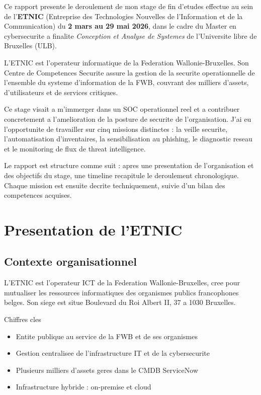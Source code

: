 \documentclass{rapport}
\begin{document}
Ce rapport presente le deroulement de mon stage de fin d'etudes effectue au
sein de l'\textbf{ETNIC} (Entreprise des Technologies Nouvelles de
l'Information et de la Communication) du \textbf{2 mars au 29 mai 2026},
dans le cadre du Master en cybersecurite a finalite \textit{Conception et
Analyse de Systemes} de l'Universite libre de Bruxelles (ULB).

L'ETNIC est l'operateur informatique de la Federation Wallonie-Bruxelles.
Son Centre de Competences Securite assure la gestion de la securite
operationnelle de l'ensemble du systeme d'information de la FWB, couvrant
des milliers d'assets, d'utilisateurs et de services critiques.

Ce stage visait a m'immerger dans un SOC operationnel reel et a contribuer
concretement a l'amelioration de la posture de securite de l'organisation.
J'ai eu l'opportunite de travailler sur cinq missions distinctes : la veille
securite, l'automatisation d'inventaires, la sensibilisation au phishing, le
diagnostic reseau et le monitoring de flux de threat intelligence.

Le rapport est structure comme suit : apres une presentation de l'organisation
et des objectifs du stage, une timeline recapitule le deroulement
chronologique. Chaque mission est ensuite decrite techniquement, suivie d'un
bilan des competences acquises.

\section{Presentation de l'ETNIC}

\subsection{Contexte organisationnel}

L'ETNIC est l'operateur ICT de la Federation Wallonie-Bruxelles, cree pour
mutualiser les ressources informatiques des organismes publics francophones
belges. Son siege est situe Boulevard du Roi Albert II, 37 a 1030 Bruxelles.

\begin{boitetech}{Chiffres cles}
\begin{itemize}[noitemsep]
  \item Entite publique au service de la FWB et de ses organismes
  \item Gestion centralisee de l'infrastructure IT et de la cybersecurite
  \item Plusieurs milliers d'assets geres dans le CMDB ServiceNow
  \item Infrastructure hybride : on-premise et cloud
\end{itemize}
\end{boitetech}
\end{document}
